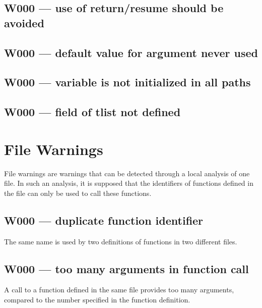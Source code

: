 \subsection{W000 --- use of return/resume should be avoided}




\subsection{W000 --- default value for argument never used}




\subsection{W000 --- variable is not initialized in all paths}




\subsection{W000 --- field of tlist not defined}




\section{File Warnings}

File warnings are warnings that can be detected through a local
analysis of one file. In such an analysis, it is supposed that the
identifiers of functions defined in the file can only be used to call
these functions.

\subsection{W000 --- duplicate function identifier}




The same name is used by two definitions of functions in two different
files.



\subsection{W000 --- too many arguments in function call}




A call to a function defined in the same file provides too many
arguments, compared to the number specified in the function definition.



